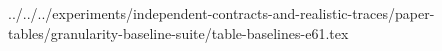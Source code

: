 ../../../experiments/independent-contracts-and-realistic-traces/paper-tables/granularity-baseline-suite/table-baselines-e61.tex